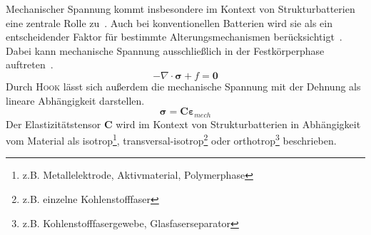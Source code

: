 Mechanischer Spannung kommt insbesondere im Kontext von Strukturbatterien eine zentrale Rolle zu~\cite{Carlstedt2020b}. Auch bei konventionellen Batterien wird sie als ein entscheidender Faktor für bestimmte Alterungsmechanismen berücksichtigt~\cite{Mueller2019}. Dabei kann mechanische Spannung ausschließlich in der Festkörperphase auftreten~\cite{Kaliaperumal2021,Berg2022}.
\begin{equation}\label{eq:stress_gov}
    -\nabla \cdot \boldsymbol{\sigma} + f = \boldsymbol{0}
\end{equation}
Durch \textsc{Hook} lässt sich außerdem die mechanische Spannung mit der Dehnung als lineare Abhängigkeit darstellen.
\begin{equation}\label{eq:stress_material}
    \boldsymbol{\sigma} = \boldsymbol{C} \boldsymbol{\varepsilon}_{mech}
\end{equation}
Der Elastizitätstensor $\boldsymbol{C}$ wird im Kontext von Strukturbatterien in Abhängigkeit vom Material als isotrop\footnote{z.B. Metallelektrode, Aktivmaterial, Polymerphase}, transversal-isotrop\footnote{z.B. einzelne Kohlenstofffaser} oder orthotrop\footnote{z.B. Kohlenstofffasergewebe, Glasfaserseparator} beschrieben.
